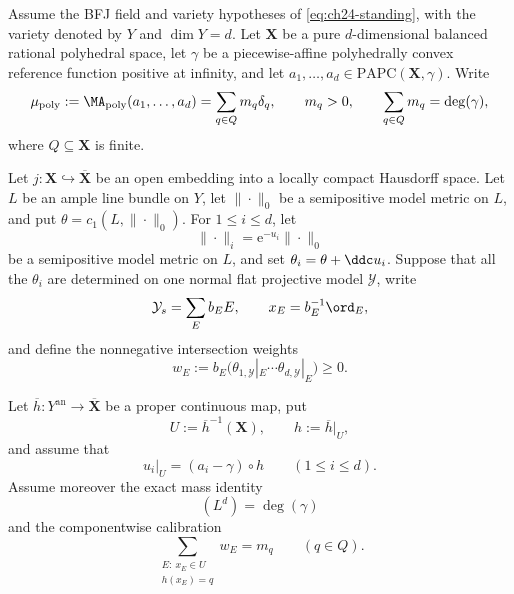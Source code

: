 \begin{proposition}
\label{prop:p055-model-calibration-transfer}
Assume the BFJ field and variety hypotheses of
\eqref{eq:ch24-standing}, with the variety denoted by $Y$ and
$\dim Y=d$.  Let $\mathbf X$ be a pure $d$-dimensional balanced rational
polyhedral space, let $\gamma$ be a piecewise-affine polyhedrally convex
reference function positive at infinity, and let
$a_1,\ldots,a_d\in\mathrm{PAPC}(\mathbf X,\gamma)$.  Write
\begin{equation}
 \mu_{\mathrm{poly}}
 :=\MA_{\mathrm{poly}}(a_1,\ldots,a_d)
 =\sum_{q\in Q}m_q\delta_q,
 \qquad m_q>0,
 \qquad \sum_{q\in Q}m_q=\deg(\gamma),
 \label{eq:p055-model-polyhedral-atoms}
\end{equation}
where $Q\subseteq\mathbf X$ is finite.

Let $j:\mathbf X\hookrightarrow\overline{\mathbf X}$ be an open embedding
into a locally compact Hausdorff space.  Let $L$ be an ample line bundle on
$Y$, let $\|\cdot\|_0$ be a semipositive model metric on $L$, and put
$\theta=c_1(L,\|\cdot\|_0)$.  For $1\leq i\leq d$, let
\begin{equation}
 \|\cdot\|_i=\mathrm e^{-u_i}\|\cdot\|_0
 \label{eq:p055-model-relative-metrics}
\end{equation}
be a semipositive model metric on $L$, and set
$\theta_i=\theta+\ddc u_i$.  Suppose that all the $\theta_i$ are determined
on one normal flat projective model $\mathcal Y$, write
\[
 \mathcal Y_s=\sum_E b_EE,
 \qquad x_E=b_E^{-1}\ord_E,
\]
and define the nonnegative intersection weights
\begin{equation}
 w_E:=b_E
 \bigl(\theta_{1,\mathcal Y}|_E\cdots
       \theta_{d,\mathcal Y}|_E\bigr)\geq0.
 \label{eq:p055-model-intersection-weights}
\end{equation}

Let $\overline h:Y^{\mathrm{an}}\to\overline{\mathbf X}$ be a proper
continuous map, put
\[
 U:=\overline h^{-1}(\mathbf X),
 \qquad h:=\overline h|_U,
\]
and assume that
\begin{equation}
 u_i|_U=(a_i-\gamma)\circ h
 \qquad(1\leq i\leq d).
 \label{eq:p055-model-lift}
\end{equation}
Assume moreover the exact mass identity
\begin{equation}
 (L^d)=\deg(\gamma)
 \label{eq:p055-model-mass-match}
\end{equation}
and the componentwise calibration
\begin{equation}
 \sum_{\substack{E:\ x_E\in U\\ h(x_E)=q}}w_E=m_q
 \qquad(q\in Q).
 \label{eq:p055-model-component-calibration}
\end{equation}


\end{proposition}
